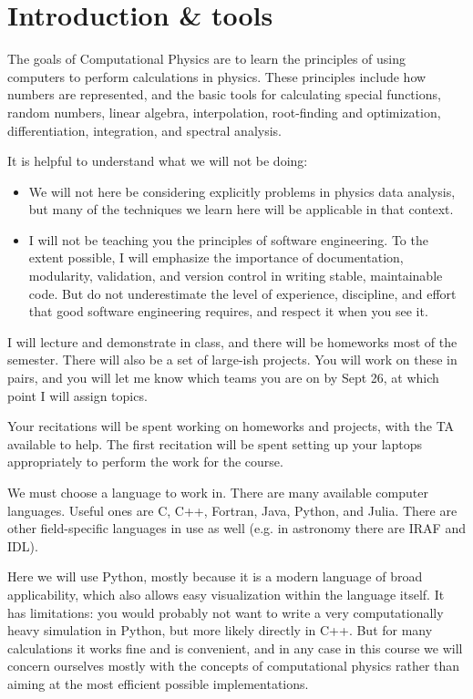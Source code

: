 \section{Introduction \& tools}

The goals of Computational Physics are to learn the principles of
using computers to perform calculations in physics. These principles
include how numbers are represented, and the basic tools for
calculating special functions, random numbers, linear algebra,
interpolation, root-finding and optimization, differentiation, 
integration, and spectral analysis.

It is helpful to understand what we will not be doing:
\begin{itemize}
\item We will not here be considering explicitly problems in physics
  data analysis, but many of the techniques we learn here will be
  applicable in that context.
\item I will not be teaching you the principles of software
  engineering. To the extent possible, I will emphasize the importance
  of documentation, modularity, validation, and version control in
  writing stable, maintainable code. But do not underestimate the
  level of experience, discipline, and effort that good software
  engineering requires, and respect it when you see it.
\end{itemize}

I will lecture and demonstrate in class, and there will be homeworks
most of the semester. There will also be a set of large-ish
projects. You will work on these in pairs, and you will let me know
which teams you are on by Sept 26, at which point I will assign
topics.

Your recitations will be spent working on homeworks and projects, with
the TA available to help. The first recitation will be spent setting
up your laptops appropriately to perform the work for the course.

We must choose a language to work in. There are many available
computer languages. Useful ones are C, C++, Fortran, Java, Python, and
Julia. There are other field-specific languages in use as well
(e.g. in astronomy there are IRAF and IDL).

Here we will use Python, mostly because it is a modern language of
broad applicability, which also allows easy visualization within the
language itself. It has limitations: you would probably not want to
write a very computationally heavy simulation in Python, but more
likely directly in C++. But for many calculations it works fine and is
convenient, and in any case in this course we will concern ourselves
mostly with the concepts of computational physics rather than aiming
at the most efficient possible implementations.

